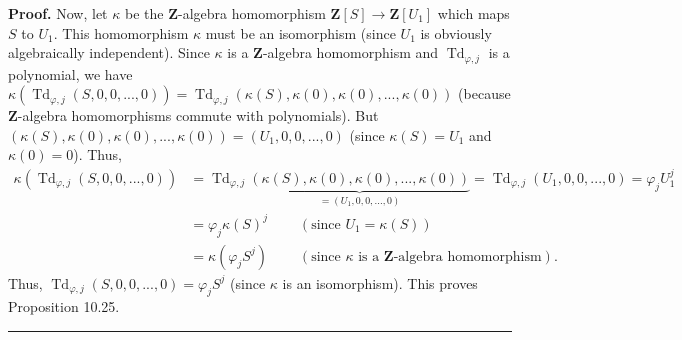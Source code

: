 \documentclass[numbers=enddot,12pt,final,onecolumn,notitlepage]{scrartcl}%
\newenvironment{proof}[1][Proof]{\noindent\textbf{#1.} }{\ \rule{0.5em}{0.5em}}
\begin{document}
\begin{proof}
Now, let $\kappa$ be the $\mathbf{Z}$-algebra homomorphism $\mathbf{Z}\left[
S\right]  \rightarrow\mathbf{Z}\left[  U_{1}\right]  $ which maps $S$ to
$U_{1}$. This homomorphism $\kappa$ must be an isomorphism (since $U_{1}$ is
obviously algebraically independent). Since $\kappa$ is a $\mathbf{Z}$-algebra
homomorphism and $\operatorname*{Td}\nolimits_{\varphi,j}$ is a polynomial, we
have $\kappa\left(  \operatorname*{Td}\nolimits_{\varphi,j}\left(
S,0,0,...,0\right)  \right)  =\operatorname*{Td}\nolimits_{\varphi,j}\left(
\kappa\left(  S\right)  ,\kappa\left(  0\right)  ,\kappa\left(  0\right)
,...,\kappa\left(  0\right)  \right)  $ (because $\mathbf{Z}$-algebra
homomorphisms commute with polynomials). But $\left(  \kappa\left(  S\right)
,\kappa\left(  0\right)  ,\kappa\left(  0\right)  ,...,\kappa\left(  0\right)
\right)  =\left(  U_{1},0,0,...,0\right)  $ (since $\kappa\left(  S\right)
=U_{1}$ and $\kappa\left(  0\right)  =0$). Thus,%
\begin{align*}
\kappa\left(  \operatorname*{Td}\nolimits_{\varphi,j}\left(
S,0,0,...,0\right)  \right)   &  =\operatorname*{Td}\nolimits_{\varphi
,j}\underbrace{\left(  \kappa\left(  S\right)  ,\kappa\left(  0\right)
,\kappa\left(  0\right)  ,...,\kappa\left(  0\right)  \right)  }_{=\left(
U_{1},0,0,...,0\right)  }=\operatorname*{Td}\nolimits_{\varphi,j}\left(
U_{1},0,0,...,0\right)  =\varphi_{j}U_{1}^{j}\\
&  =\varphi_{j}\kappa\left(  S\right)  ^{j}\ \ \ \ \ \ \ \ \ \ \left(
\text{since }U_{1}=\kappa\left(  S\right)  \right) \\
&  =\kappa\left(  \varphi_{j}S^{j}\right)  \ \ \ \ \ \ \ \ \ \ \left(
\text{since }\kappa\text{ is a }\mathbf{Z}\text{-algebra homomorphism}\right)
.
\end{align*}
Thus, $\operatorname*{Td}\nolimits_{\varphi,j}\left(  S,0,0,...,0\right)
=\varphi_{j}S^{j}$ (since $\kappa$ is an isomorphism). This proves Proposition 10.25.
\end{proof}
\end{document}

